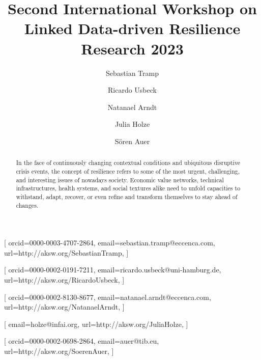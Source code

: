 \documentclass{ceurart}
\begin{document}


\title{Second International Workshop on\\ Linked Data-driven Resilience Research 2023}


\author[1]{Sebastian Tramp}[%
orcid=0000-0003-4707-2864,
email=sebastian.tramp@eccenca.com,
url=http://aksw.org/SebastianTramp,
]

\author[2]{Ricardo Usbeck}[%
orcid=0000-0002-0191-7211,
email=ricardo.usbeck@uni-hamburg.de,
url=http://aksw.org/RicardoUsbeck,
]
\author[1]{Natanael Arndt}[%
orcid=0000-0002-8130-8677,
email=natanael.arndt@eccenca.com,
url=http://aksw.org/NatanaelArndt,
]

\author[3]{Julia Holze}[%
email=holze@infai.org,
url=http://aksw.org/JuliaHolze,
]

\author[4]{Sören Auer}[%
orcid=0000-0002-0698-2864,
email=auer@tib.eu,
url=http://aksw.org/SoerenAuer,
]

\address[1]{eccenca GmbH, Hainstraße 8, 04109 Leipzig, Germany}

\address[2]{University of Hamburg, Mittelweg 177, 20148 Hamburg, Germany}

\address[3]{Institut für Angewandte Informatik e.V., Goerdelerring 9, 04109 Leipzig, Germany}

\address[4]{Gottfried Wilhelm Leibniz University Hannover and Technische Informationsbibliothek (TIB), Welfengarten 1 B, 30167 Hannover, Germany}


\begin{abstract}
In the face of continuously changing contextual conditions and ubiquitous disruptive crisis events, the concept of resilience refers to some of the most urgent, challenging, and interesting issues of nowadays society. Economic value networks, technical infrastructures, health systems, and social textures alike need to unfold capacities to withstand, adapt, recover, or even refine and transform themselves to stay ahead of changes.
\end{abstract}
\end{document}
